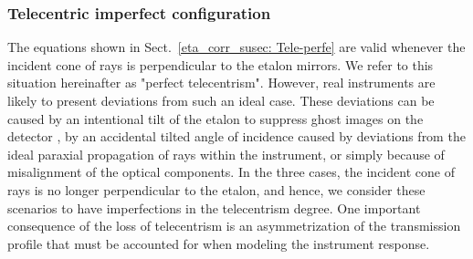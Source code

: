 \subsubsection{\label{eta_corr_susec: Tele-imperfe}Telecentric imperfect configuration}
The equations shown in Sect.~\ref{eta_corr_susec: Tele-perfe} are valid whenever the incident cone of rays is perpendicular to the etalon mirrors. We refer to this situation hereinafter as "perfect telecentrism". However, real instruments are likely to present deviations from such an ideal case. These deviations can be caused by an intentional tilt of the etalon to suppress ghost images on the detector \citep{ghosts-etalon}, by an accidental tilted angle of incidence caused by deviations from the ideal paraxial propagation of rays within the instrument, or simply because of misalignment of the optical components. In the three cases, the incident cone of rays is no longer perpendicular to the etalon, and hence, we consider these scenarios to have imperfections in the telecentrism degree. One important consequence of the loss of telecentrism is an asymmetrization of the transmission profile that must be accounted for when modeling the instrument response.

